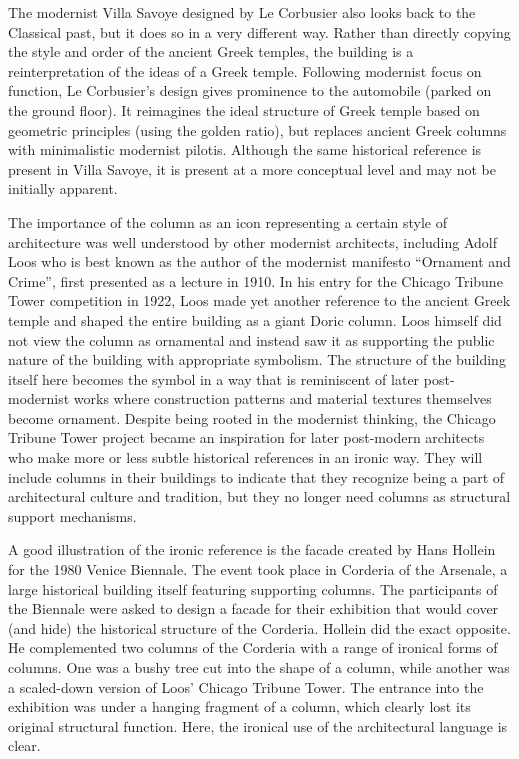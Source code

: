The modernist Villa Savoye designed by Le Corbusier also looks back to the Classical past,
but it does so in a very different way. Rather than directly copying the style and order of the
ancient Greek temples, the building is a reinterpretation of the ideas of a Greek
temple.
Following modernist focus on function, Le Corbusier's design gives prominence to the automobile
(parked on the ground floor). It reimagines the ideal structure of Greek temple based on
geometric principles (using the golden ratio), but replaces ancient Greek columns with
minimalistic modernist pilotis. Although the same historical reference is present in Villa Savoye,
it is present at a more conceptual level and may not be initially apparent.

The importance of the column as an icon representing a certain style of architecture was well
understood by other modernist architects, including Adolf Loos who is best known as the author
of the modernist manifesto ``Ornament and Crime'', first presented as a lecture in 1910.
In his entry for the Chicago Tribune Tower competition in 1922, Loos made yet another reference
to the ancient Greek temple and shaped the entire building as a giant Doric column. Loos himself
did not view the column as ornamental and instead saw it as supporting the public nature of the
building with appropriate symbolism.
The structure of the building itself here becomes the symbol in a way that is reminiscent
of later post-modernist works where construction patterns and material textures themselves become
ornament. Despite being rooted in the modernist thinking, the Chicago Tribune
Tower project became an inspiration for later post-modern architects who make more or less subtle
historical references in an ironic way. They will include columns in their buildings to indicate
that they recognize being a part of architectural culture and tradition, but they no longer need
columns as structural support mechanisms.

A good illustration of the ironic reference is the facade created by Hans Hollein for the 1980
Venice Biennale. The event took place in Corderia of the Arsenale, a large historical building
itself featuring supporting columns. The participants of the Biennale were asked to design a
facade for their exhibition that would cover (and hide) the historical structure of the Corderia.
Hollein did the exact opposite. He complemented two columns of the Corderia with a range of
ironical forms of columns. One was a bushy tree cut into the shape of a column, while another was
a scaled-down version of Loos' Chicago Tribune Tower. The entrance into the exhibition was under
a hanging fragment of a column, which clearly lost its original structural function. Here, the
ironical use of the architectural language is clear.

